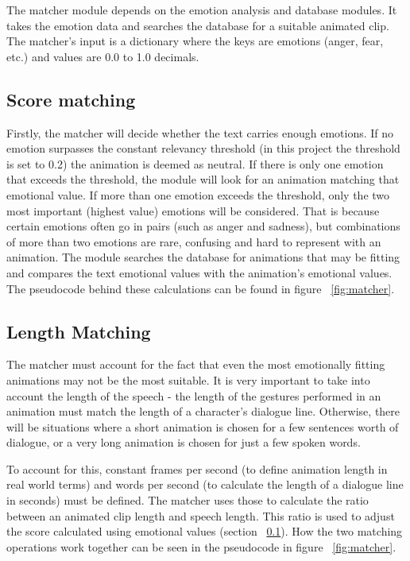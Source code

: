 The matcher module depends on the emotion analysis and database modules. It takes the emotion data and searches the database for a suitable animated clip. The matcher's input is a dictionary where the keys are emotions (anger, fear, etc.) and values are 0.0 to 1.0 decimals.

\subsection{Score matching}
\label{sec:scorematching}
Firstly, the matcher will decide whether the text carries enough emotions. If no emotion surpasses the constant relevancy threshold (in this project the threshold is set to 0.2) the animation is deemed as neutral. If there is only one emotion that exceeds the threshold, the module will look for an animation matching that emotional value. If more than one emotion exceeds the threshold, only the two most important (highest value) emotions will be considered. That is because certain emotions often go in pairs (such as anger and sadness), but combinations of more than two emotions are rare, confusing and hard to represent with an animation. The module searches the database for animations that may be fitting and compares the text emotional values with the animation's emotional values. The pseudocode behind these calculations can be found in figure ~\ref{fig:matcher}.

\subsection{Length Matching}
The matcher must account for the fact that even the most emotionally fitting animations may not be the most suitable. It is very important to take into account the length of the speech - the length of the gestures performed in an animation must match the length of a character's dialogue line. Otherwise, there will be situations where a short animation is chosen for a few sentences worth of dialogue, or a very long animation is chosen for just a few spoken words.

To account for this, constant frames per second (to define animation length in real world terms) and words per second (to calculate the length of a dialogue line in seconds) must be defined. The matcher uses those to calculate the ratio between an animated clip length and speech length. This ratio is used to adjust the score calculated using emotional values (section ~\ref{sec:scorematching}). How the two matching operations work together can be seen in the pseudocode in figure ~\ref{fig:matcher}.

